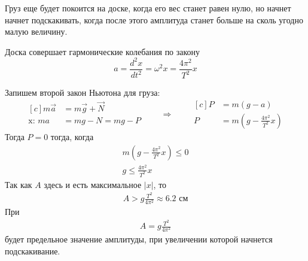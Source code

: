 \documentclass[a5paper,10pt]{article}
\begin{document}
Груз еще будет покоится на доске, когда его вес станет равен нулю, но начнет начнет подскакивать, когда после этого амплитуда станет больше на сколь угодно малую величину.

Доска совершает гармонические колебания по закону
\begin{equation*}
     a=\frac{d^2x}{dt^2}=\omega^2x=\frac{4\pi^2}{T^2}x
 \end{equation*} 

Запишем второй закон Ньютона для груза:
\begin{equation*}
	\begin{aligned}[c]
		m\vec{a}&=m\vec{g}+\vec{N}\\
        \text{x: }ma&=mg-N=mg-P\\
	\end{aligned}
		\qquad\Longrightarrow\qquad
	\begin{aligned}[c]
		P&=m(g-a)\\
        P&=m(g-\frac{4\pi^2}{T^2}x)
	\end{aligned}
\end{equation*}
Тогда $P=0$ тогда, когда 
\begin{gather*}
    {}m(g-\frac{4\pi^2}{T^2}x)\leq{0}\\
    g\leq{\frac{4\pi^2}{T^2}x}
\end{gather*}
Так как $A$ здесь и есть максимальное $|x|$, то 
\begin{gather*}
    A>{g\frac{T^2}{4\pi^2}}\approx6.2\text{ см}
\end{gather*}
При 
\begin{gather*}
    A={g\frac{T^2}{4\pi^2}}
\end{gather*}
будет предельное значение амплитуды, при увеличении которой начнется подскакивание.
\end{document}
